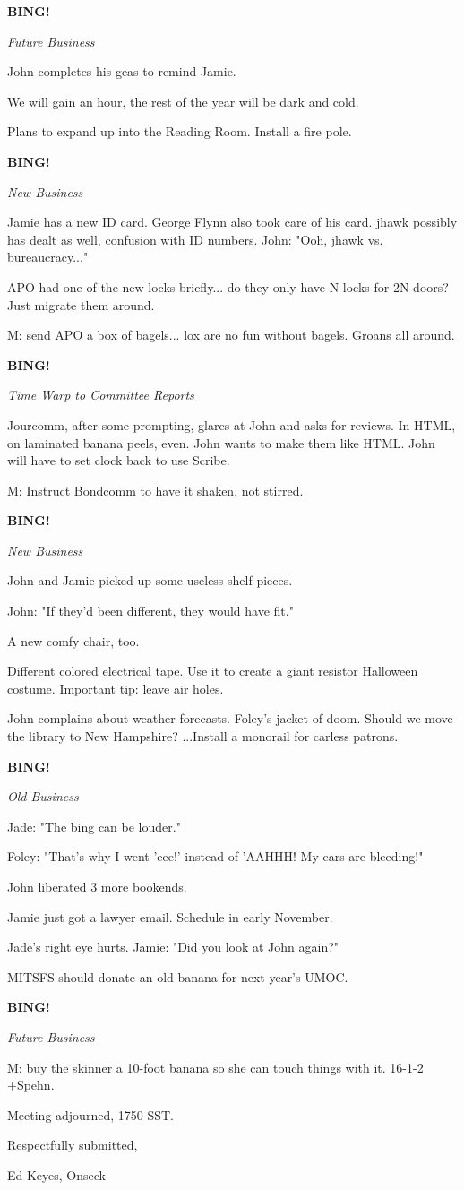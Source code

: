 \documentclass[12pt]{article}
\newcommand{\bing}{{\bf BING!} }
\newcommand{\goto}[1]{\bing \vskip 12pt \centerline{{\em{#1}}}}
\begin{document}
\goto{Future Business}

John completes his geas to remind Jamie.

We will gain an hour, the rest of the year will be dark and cold.

Plans to expand up into the Reading Room. Install a fire pole.

\goto{New Business}

Jamie has a new ID card. George Flynn also took care of his card. jhawk possibly has dealt as well, confusion with ID numbers. John: "Ooh, jhawk vs. bureaucracy..."

APO had one of the new locks briefly... do they only have N locks for 2N doors? Just migrate them around.

M: send APO a box of bagels... lox are no fun without bagels. Groans all around.

\goto{Time Warp to Committee Reports}

Jourcomm, after some prompting, glares at John and asks for reviews. In HTML, on laminated banana peels, even. John wants to make them like HTML. John will have to set clock back to use Scribe.

M: Instruct Bondcomm to have it shaken, not stirred.

\goto{New Business}

John and Jamie picked up some useless shelf pieces.

John: "If they'd been different, they would have fit."

A new comfy chair, too.

Different colored electrical tape. Use it to create a giant resistor Halloween costume. Important tip: leave air holes.

John complains about weather forecasts. Foley's jacket of doom. Should we move the library to New Hampshire? ...Install a monorail for carless patrons.

\goto{Old Business}

Jade: "The bing can be louder."

Foley: "That's why I went 'eee!' instead of 'AAHHH! My ears are bleeding!"

John liberated 3 more bookends.

Jamie just got a lawyer email. Schedule in early November.

Jade's right eye hurts. Jamie: "Did you look at John again?"

MITSFS should donate an old banana for next year's UMOC.

\goto{Future Business}

M: buy the skinner a 10-foot banana so she can touch things with it. 16-1-2 +Spehn.

\vspace{12pt}

\noindent
Meeting adjourned, 1750 SST.

\vspace{18pt}

\centerline{Respectfully submitted,}
\centerline{Ed Keyes, Onseck}
\end{document}
